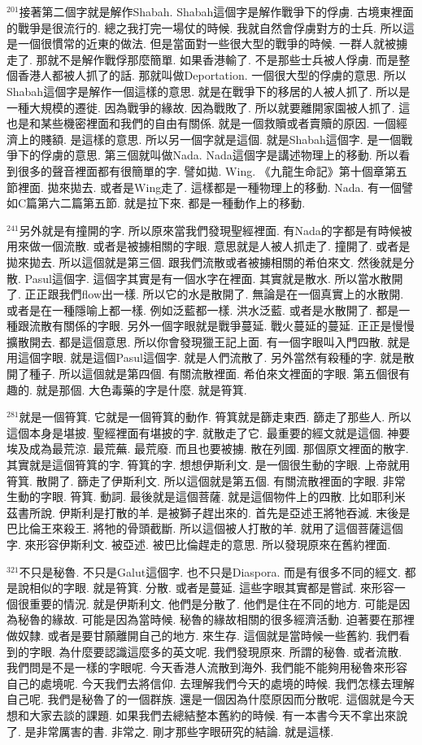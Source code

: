 \documentclass{book}
\begin{document}
$^{201}$接著第二個字就是解作Shabah.
Shabah這個字是解作戰爭下的俘虜.
古境東裡面的戰爭是很流行的.
總之我打完一場仗的時候.
我就自然會俘虜對方的士兵.
所以這是一個很慣常的近東的做法.
但是當面對一些很大型的戰爭的時候.
一群人就被擄走了.
那就不是解作戰俘那麼簡單.
如果香港輸了.
不是那些士兵被人俘虜.
而是整個香港人都被人抓了的話.
那就叫做Deportation.
一個很大型的俘虜的意思.
所以Shabah這個字是解作一個這樣的意思.
就是在戰爭下的移居的人被人抓了.
所以是一種大規模的遷徙.
因為戰爭的緣故.
因為戰敗了.
所以就要離開家園被人抓了.
這也是和某些機密裡面和我們的自由有關係.
就是一個救贖或者賣贖的原因.
一個經濟上的賤額.
是這樣的意思.
所以另一個字就是這個.
就是Shabah這個字.
是一個戰爭下的俘虜的意思.
第三個就叫做Nada.
Nada這個字是講述物理上的移動.
所以看到很多的聲音裡面都有很簡單的字.
譬如拋.
Wing.
《九龍生命記》第十個章第五節裡面.
拋來拋去.
或者是Wing走了.
這樣都是一種物理上的移動.
Nada.
有一個譬如C篇第六二篇第五節.
就是拉下來.
都是一種動作上的移動.

$^{241}$另外就是有撞開的字.
所以原來當我們發現聖經裡面.
有Nada的字都是有時候被用來做一個流散.
或者是被擄相關的字眼.
意思就是人被人抓走了.
撞開了.
或者是拋來拋去.
所以這個就是第三個.
跟我們流散或者被擄相關的希伯來文.
然後就是分散.
Pasul這個字.
這個字其實是有一個水字在裡面.
其實就是散水.
所以當水散開了.
正正跟我們flow出一樣.
所以它的水是散開了.
無論是在一個真實上的水散開.
或者是在一種隱喻上都一樣.
例如泛藍都一樣.
洪水泛藍.
或者是水散開了.
都是一種跟流散有關係的字眼.
另外一個字眼就是戰爭蔓延.
戰火蔓延的蔓延.
正正是慢慢擴散開去.
都是這個意思.
所以你會發現獵王記上面.
有一個字眼叫入門四散.
就是用這個字眼.
就是這個Pasul這個字.
就是人們流散了.
另外當然有殺種的字.
就是散開了種子.
所以這個就是第四個.
有關流散裡面.
希伯來文裡面的字眼.
第五個很有趣的.
就是那個.
大色毒藥的字是什麼.
就是筲箕.

$^{281}$就是一個筲箕.
它就是一個筲箕的動作.
筲箕就是篩走東西.
篩走了那些人.
所以這個本身是堪披.
聖經裡面有堪披的字.
就散走了它.
最重要的經文就是這個.
神要埃及成為最荒涼.
最荒蕪.
最荒廢.
而且也要被擄.
散在列國.
那個原文裡面的散字.
其實就是這個筲箕的字.
筲箕的字.
想想伊斯利文.
是一個很生動的字眼.
上帝就用筲箕.
散開了.
篩走了伊斯利文.
所以這個就是第五個.
有關流散裡面的字眼.
非常生動的字眼.
筲箕.
動詞.
最後就是這個菩薩.
就是這個物件上的四散.
比如耶利米茲書所說.
伊斯利是打散的羊.
是被獅子趕出來的.
首先是亞述王將牠吞滅.
末後是巴比倫王來殺王.
將牠的骨頭截斷.
所以這個被人打散的羊.
就用了這個菩薩這個字.
來形容伊斯利文.
被亞述.
被巴比倫趕走的意思.
所以發現原來在舊約裡面.

$^{321}$不只是秘魯.
不只是Galut這個字.
也不只是Diaspora.
而是有很多不同的經文.
都是說相似的字眼.
就是筲箕.
分散.
或者是蔓延.
這些字眼其實都是嘗試.
來形容一個很重要的情況.
就是伊斯利文.
他們是分散了.
他們是住在不同的地方.
可能是因為秘魯的緣故.
可能是因為當時候.
秘魯的緣故相關的很多經濟活動.
迫著要在那裡做奴隸.
或者是要甘願離開自己的地方.
來生存.
這個就是當時候一些舊約.
我們看到的字眼.
為什麼要認識這麼多的英文呢.
我們發現原來.
所謂的秘魯.
或者流散.
我們問是不是一樣的字眼呢.
今天香港人流散到海外.
我們能不能夠用秘魯來形容自己的處境呢.
今天我們去將信仰.
去理解我們今天的處境的時候.
我們怎樣去理解自己呢.
我們是秘魯了的一個群族.
還是一個因為什麼原因而分散呢.
這個就是今天想和大家去談的課題.
如果我們去總結整本舊約的時候.
有一本書今天不拿出來說了.
是非常厲害的書.
非常之.
剛才那些字眼研究的結論.
就是這樣.
\end{document}
